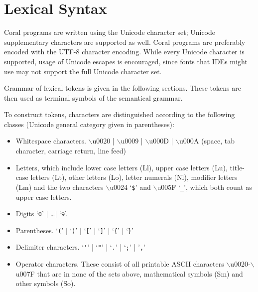 
\newcommand{\Unicode}[1]{\mbox{$\backslash$u{#1}}}
\newcommand{\UnicodeRange}[2]{\mbox{$\backslash$u{#1}-$\backslash$u{#2}}}

\chapter{Lexical Syntax}

Coral programs are written using the Unicode character set; Unicode supplementary characters are supported as well. Coral programs are preferably encoded with the UTF-8 character encoding. While every Unicode character is supported, usage of Unicode escapes is encouraged, since fonts that IDEs might use may not support the full Unicode character set.

Grammar of lexical tokens is given in the following sections. These tokens are then used as terminal symbols of the semantical grammar. 

To construct tokens, characters are distinguished according to the following classes (Unicode general category given in parentheses):
\begin{itemize}
\item 
Whitespace characters. \Unicode{0020} | \Unicode{0009} | \Unicode{000D} | \Unicode{000A} (space, tab character, carriage return, line feed)

\item
Letters, which include lower case letters (Ll), upper case letters (Lu), title-case letters (Lt), other letters (Lo), letter numerals (Nl), modifier letters (Lm) and the two characters \Unicode{0024} `\lstinline[mathescape=false]!$!' and \Unicode{005F} `\lstinline!_!', which both count as upper case letters. 

\item
Digits `\lstinline!0!' | \ldots \thinspace | `\lstinline!9!'. 

\item
Parentheses. `\lstinline!(!' | `\lstinline!)!' | `\lstinline![!' | `\lstinline!]!' | `\lstinline!{!' | `\lstinline!}!'

\item
Delimiter characters. `\lstinline!'!' | `\lstinline!"!' | `\lstinline!.!' | `\lstinline!;!' | '\lstinline!,!'

\item
Operator characters. These consist of all printable ASCII characters \UnicodeRange{0020}{007F} that are in none of the sets above, mathematical symbols (Sm) and other symbols (So). 
\end{itemize}

